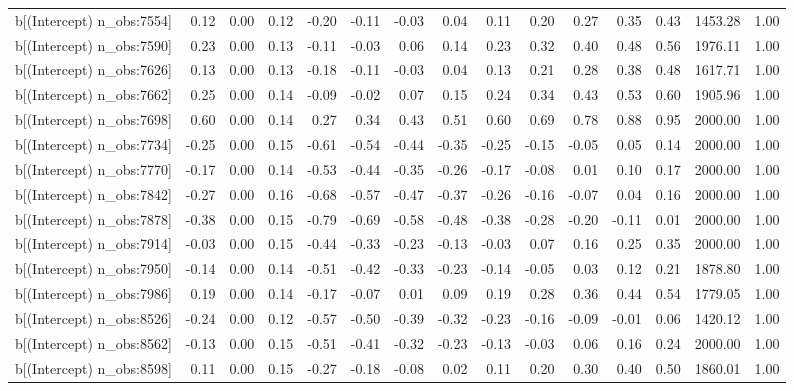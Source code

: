 \begin{table}[ht]
\begin{tabular}{rrrrrrrrrrrrrrr}
  b[(Intercept) n\_obs:7554] & 0.12 & 0.00 & 0.12 & -0.20 & -0.11 & -0.03 & 0.04 & 0.11 & 0.20 & 0.27 & 0.35 & 0.43 & 1453.28 & 1.00 \\ 
  b[(Intercept) n\_obs:7590] & 0.23 & 0.00 & 0.13 & -0.11 & -0.03 & 0.06 & 0.14 & 0.23 & 0.32 & 0.40 & 0.48 & 0.56 & 1976.11 & 1.00 \\ 
  b[(Intercept) n\_obs:7626] & 0.13 & 0.00 & 0.13 & -0.18 & -0.11 & -0.03 & 0.04 & 0.13 & 0.21 & 0.28 & 0.38 & 0.48 & 1617.71 & 1.00 \\ 
  b[(Intercept) n\_obs:7662] & 0.25 & 0.00 & 0.14 & -0.09 & -0.02 & 0.07 & 0.15 & 0.24 & 0.34 & 0.43 & 0.53 & 0.60 & 1905.96 & 1.00 \\ 
  b[(Intercept) n\_obs:7698] & 0.60 & 0.00 & 0.14 & 0.27 & 0.34 & 0.43 & 0.51 & 0.60 & 0.69 & 0.78 & 0.88 & 0.95 & 2000.00 & 1.00 \\ 
  b[(Intercept) n\_obs:7734] & -0.25 & 0.00 & 0.15 & -0.61 & -0.54 & -0.44 & -0.35 & -0.25 & -0.15 & -0.05 & 0.05 & 0.14 & 2000.00 & 1.00 \\ 
  b[(Intercept) n\_obs:7770] & -0.17 & 0.00 & 0.14 & -0.53 & -0.44 & -0.35 & -0.26 & -0.17 & -0.08 & 0.01 & 0.10 & 0.17 & 2000.00 & 1.00 \\ 
  b[(Intercept) n\_obs:7842] & -0.27 & 0.00 & 0.16 & -0.68 & -0.57 & -0.47 & -0.37 & -0.26 & -0.16 & -0.07 & 0.04 & 0.16 & 2000.00 & 1.00 \\ 
  b[(Intercept) n\_obs:7878] & -0.38 & 0.00 & 0.15 & -0.79 & -0.69 & -0.58 & -0.48 & -0.38 & -0.28 & -0.20 & -0.11 & 0.01 & 2000.00 & 1.00 \\ 
  b[(Intercept) n\_obs:7914] & -0.03 & 0.00 & 0.15 & -0.44 & -0.33 & -0.23 & -0.13 & -0.03 & 0.07 & 0.16 & 0.25 & 0.35 & 2000.00 & 1.00 \\ 
  b[(Intercept) n\_obs:7950] & -0.14 & 0.00 & 0.14 & -0.51 & -0.42 & -0.33 & -0.23 & -0.14 & -0.05 & 0.03 & 0.12 & 0.21 & 1878.80 & 1.00 \\ 
  b[(Intercept) n\_obs:7986] & 0.19 & 0.00 & 0.14 & -0.17 & -0.07 & 0.01 & 0.09 & 0.19 & 0.28 & 0.36 & 0.44 & 0.54 & 1779.05 & 1.00 \\ 
  b[(Intercept) n\_obs:8526] & -0.24 & 0.00 & 0.12 & -0.57 & -0.50 & -0.39 & -0.32 & -0.23 & -0.16 & -0.09 & -0.01 & 0.06 & 1420.12 & 1.00 \\ 
  b[(Intercept) n\_obs:8562] & -0.13 & 0.00 & 0.15 & -0.51 & -0.41 & -0.32 & -0.23 & -0.13 & -0.03 & 0.06 & 0.16 & 0.24 & 2000.00 & 1.00 \\ 
  b[(Intercept) n\_obs:8598] & 0.11 & 0.00 & 0.15 & -0.27 & -0.18 & -0.08 & 0.02 & 0.11 & 0.20 & 0.30 & 0.40 & 0.50 & 1860.01 & 1.00 \\ 

\end{tabular}
\end{table}
